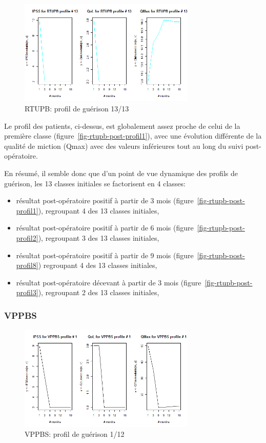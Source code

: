 \begin{figure}[H]
\centering
\includegraphics[width=0.75\textwidth]{../Fig/RTUPB/rtupb-profil-post-13.png}
\caption[]{RTUPB: profil de guérison 13/13}
\label{fig-rtupb-post-profil13}
\end{figure}

Le profil des patients, ci-dessus, est globalement assez proche de celui de la première classe (figure~\ref{fig-rtupb-post-profil1}), avec une évolution différente de la qualité de miction (Qmax) avec des valeurs inférieures tout au long du suivi post-opératoire.

En résumé, il semble donc que d'un point de vue dynamique des profils de guérison, les 13 classes initiales se factorisent en 4 classes:
\begin{itemize}
\item résultat post-opératoire positif à partir de 3 mois (figure~\ref{fig-rtupb-post-profil1}), regroupant 4 des 13 classes initiales,
\item résultat post-opératoire positif à partir de 6 mois (figure~\ref{fig-rtupb-post-profil2}), regroupant 3 des 13 classes initiales,
\item résultat post-opératoire positif à partir de 9 mois (figure~\ref{fig-rtupb-post-profil8}) regroupant 4 des 13 classes initiales,
\item résultat post-opératoire décevant à partir de 3 mois (figure~\ref{fig-rtupb-post-profil3}), regroupant 2 des 13 classes initiales,
\end{itemize}

%
\subsubsection{VPPBS}

\begin{figure}[H]
\centering
\includegraphics[width=0.75\textwidth]{../Fig/VPPBS/vppbs-profil-post-01.png}
\caption[]{VPPBS: profil de guérison 1/12}
\label{fig-vppbs-post-profil1}
\end{figure}


